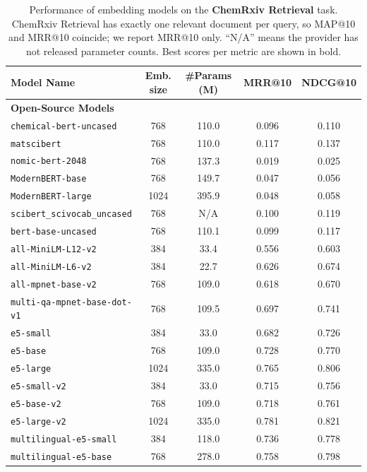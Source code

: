 \documentclass[twoside,twocolumn,9pt]{article}
\begin{document}
\begin{table}[!t]
\centering \small
\caption{Performance of embedding models on the \textbf{ChemRxiv Retrieval} task. ChemRxiv Retrieval has exactly one relevant document per query, so MAP@10 and MRR@10 coincide; we report MRR@10 only. “N/A” means the provider has not released parameter counts. Best scores per metric are shown in bold.}
\label{tab:chemrxiv-results}
\begin{tabular}{lcccc}
\toprule
Model Name & Emb. size & \#Params (M) & MRR@10 & NDCG@10 \\
\midrule
    \multicolumn{5}{l}{\textbf{Open-Source Models}}\\
    \texttt{chemical-bert-uncased} & 768 & 110.0 & 0.096 & 0.110 \\
    \texttt{matscibert} & 768 & 110.0 & 0.117 & 0.137 \\
    \texttt{nomic-bert-2048} & 768 & 137.3 & 0.019 & 0.025 \\
    \texttt{ModernBERT-base} & 768 & 149.7 & 0.047 & 0.056 \\
    \texttt{ModernBERT-large} & 1024 & 395.9 & 0.048 & 0.058 \\
    \texttt{scibert\_scivocab\_uncased} & 768 & N/A & 0.100 & 0.119 \\
    \texttt{bert-base-uncased} & 768 & 110.1 & 0.099 & 0.117 \\
    \texttt{all-MiniLM-L12-v2} & 384 & 33.4 & 0.556 & 0.603 \\
    \texttt{all-MiniLM-L6-v2} & 384 & 22.7 & 0.626 & 0.674 \\
    \texttt{all-mpnet-base-v2} & 768 & 109.0 & 0.618 & 0.670 \\
    \texttt{multi-qa-mpnet-base-dot-v1} & 768 & 109.5 & 0.697 & 0.741 \\
    \texttt{e5-small} & 384 & 33.0 & 0.682 & 0.726 \\
    \texttt{e5-base} & 768 & 109.0 & 0.728 & 0.770 \\
    \texttt{e5-large} & 1024 & 335.0 & 0.765 & 0.806 \\
    \texttt{e5-small-v2} & 384 & 33.0 & 0.715 & 0.756 \\
    \texttt{e5-base-v2} & 768 & 109.0 & 0.718 & 0.761 \\
    \texttt{e5-large-v2} & 1024 & 335.0 & 0.781 & 0.821 \\
    \texttt{multilingual-e5-small} & 384 & 118.0 & 0.736 & 0.778 \\
    \texttt{multilingual-e5-base} & 768 & 278.0 & 0.758 & 0.798 \\

\end{tabular}
\end{table}
\end{document}
